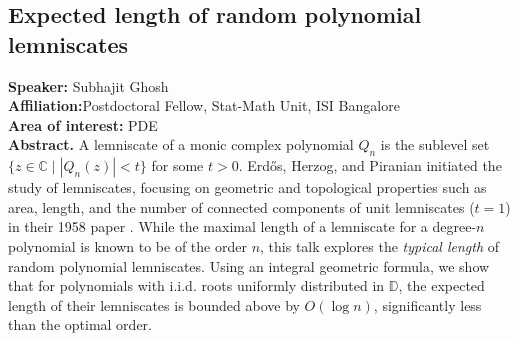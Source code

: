 \subsection*{Expected length of random polynomial lemniscates} %
\noindent
\textbf{Speaker:} Subhajit Ghosh \\ %
\textbf{Affiliation:}Postdoctoral Fellow, Stat-Math Unit, ISI Bangalore \\ %
\textbf{Area of interest:} PDE \\

\noindent\textbf{Abstract.}  A lemniscate of a monic complex polynomial \( Q_n \) is the sublevel set \( \{z \in \mathbb{C} \mid |Q_n(z)| < t\} \) for some \( t > 0 \). Erdős, Herzog, and Piranian initiated the study of lemniscates, focusing on geometric and topological properties such as area, length, and the number of connected components of unit lemniscates (\( t = 1 \)) in their 1958 paper \cite{metricEHP}. While the maximal length of a lemniscate for a degree-\( n \) polynomial is known to be of the order \( n \), this talk explores the \emph{typical length} of random polynomial lemniscates. Using an integral geometric formula, we show that for polynomials with i.i.d. roots uniformly distributed in \( \mathbb{D} \), the expected length of their lemniscates is bounded above by \( O(\log n) \), significantly less than the optimal order.


